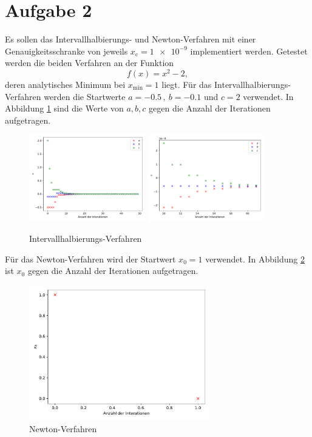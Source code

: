 \section*{Aufgabe 2}

Es sollen das Intervallhalbierungs- und Newton-Verfahren mit einer Genauigkeitsschranke von jeweils \(x_\text{c} = \num{1e-9}\) implementiert werden. Getestet werden die beiden Verfahren an der Funktion
\begin{equation}
  f(x) = x^2-2, \label{eqn:f}
\end{equation}
deren analytisches Minimum bei \(x_\text{min} = 1\) liegt.
Für das Intervallhalbierungs-Verfahren werden die Startwerte \(a = \num{-0,5} \,, \: b = \num{-0,1}\) und \(c = 2\) verwendet.
In Abbildung \ref{fig:intervall} sind die Werte von \(a,b,c\) gegen die Anzahl der Iterationen aufgetragen.
\begin{figure}
  \centering
  \includegraphics[width=0.45\textwidth]{A2/build/intervallhalbierung.pdf}
  \includegraphics[width=0.45\textwidth]{A2/build/intervallhalbierung2.pdf}
  \caption{Intervallhalbierungs-Verfahren}
  \label{fig:intervall}
\end{figure}
Für das Newton-Verfahren wird der Startwert \(x_0 = 1\) verwendet. In Abbildung \ref{fig:newton} ist \(x_0\) gegen die Anzahl der Iterationen aufgetragen.
\begin{figure}
  \centering
  \includegraphics[width=0.7\textwidth]{A2/build/newton.pdf}
  \caption{Newton-Verfahren}
  \label{fig:newton}
\end{figure}
